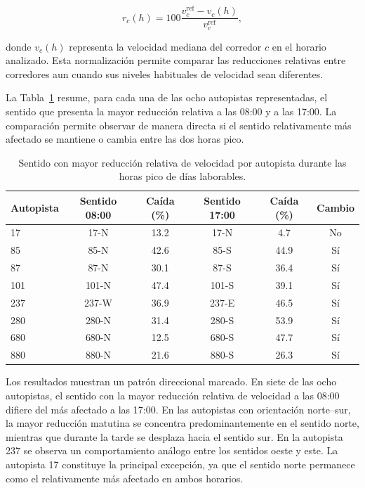 \documentclass[11pt]{article}
\begin{document}
\[
r_c(h)
=
100
\frac{v^{\mathrm{ref}}_c-v_c(h)}
     {v^{\mathrm{ref}}_c},
\]

donde $v_c(h)$ representa la velocidad mediana del corredor $c$ en el horario analizado. Esta normalización permite comparar las reducciones relativas entre corredores aun cuando sus niveles habituales de velocidad sean diferentes.

La Tabla~\ref{tab:patron_direccional} resume, para cada una de las ocho autopistas representadas, el sentido que presenta la mayor reducción relativa a las 08:00 y a las 17:00. La comparación permite observar de manera directa si el sentido relativamente más afectado se mantiene o cambia entre las dos horas pico.

\begin{table}[htbp]
\centering
\small
\caption{Sentido con mayor reducción relativa de velocidad por autopista durante las horas pico de días laborables.}
\label{tab:patron_direccional}
\begin{tabular}{lccccc}
\hline
\textbf{Autopista} &
\textbf{Sentido 08:00} &
\textbf{Caída (\%)} &
\textbf{Sentido 17:00} &
\textbf{Caída (\%)} &
\textbf{Cambio} \\
\hline
17  & 17-N  & 13.2 & 17-N  & 4.7  & No \\
85  & 85-N  & 42.6 & 85-S  & 44.9 & Sí \\
87  & 87-N  & 30.1 & 87-S  & 36.4 & Sí \\
101 & 101-N & 47.4 & 101-S & 39.1 & Sí \\
237 & 237-W & 36.9 & 237-E & 46.5 & Sí \\
280 & 280-N & 31.4 & 280-S & 53.9 & Sí \\
680 & 680-N & 12.5 & 680-S & 47.7 & Sí \\
880 & 880-N & 21.6 & 880-S & 26.3 & Sí \\
\hline
\end{tabular}
\end{table}

Los resultados muestran un patrón direccional marcado. En siete de las ocho autopistas, el sentido con la mayor reducción relativa de velocidad a las 08:00 difiere del más afectado a las 17:00. En las autopistas con orientación norte--sur, la mayor reducción matutina se concentra predominantemente en el sentido norte, mientras que durante la tarde se desplaza hacia el sentido sur. En la autopista 237 se observa un comportamiento análogo entre los sentidos oeste y este. La autopista 17 constituye la principal excepción, ya que el sentido norte permanece como el relativamente más afectado en ambos horarios.
\end{document}

